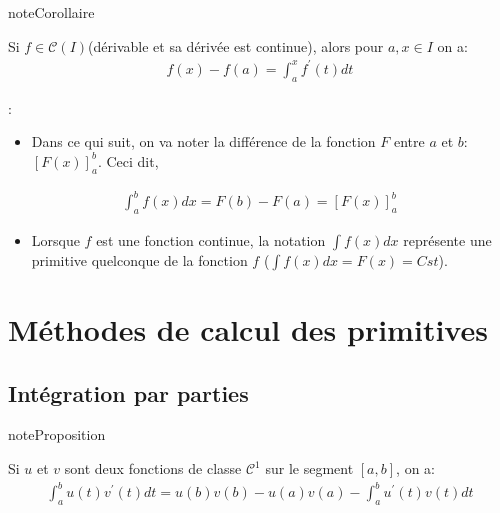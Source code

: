 \documentclass[letterpaper,10pt,french]{jupyterBook}
\begin{document}
\begin{sphinxadmonition}{note}{Corollaire}

\sphinxAtStartPar
Si \(f \in \mathcal C (I)\)(dérivable et sa dérivée est continue), alors pour \(a, x \in I\) on a:
\begin{equation*}
\begin{split}
f(x) - f(a) = \int_a^x f^{'}(t)dt
\end{split}
\end{equation*}\end{sphinxadmonition}

\sphinxAtStartPar
{}:
\begin{itemize}
\item {} 
\sphinxAtStartPar
Dans ce qui suit, on va noter la différence de la fonction \(F\) entre \(a\) et \(b\): \([F(x)]_a^b\). Ceci dit,

\end{itemize}
\begin{equation*}
\begin{split}
\int_a^b f(x)dx = F(b) - F(a) =[F(x)]_a^b
\end{split}
\end{equation*}\begin{itemize}
\item {} 
\sphinxAtStartPar
Lorsque \(f\) est une fonction continue, la notation \(\int f(x)dx\) représente une primitive quelconque de la fonction \(f\) (\(\int f(x)dx = F(x) = Cst\)).

\end{itemize}


\section{Méthodes de calcul des primitives}
\label{\detokenize{methodcalp:methodes-de-calcul-des-primitives}}\label{\detokenize{methodcalp::doc}}

\subsection{Intégration par parties}
\label{\detokenize{methodcalp:integration-par-parties}}
\begin{sphinxadmonition}{note}{Proposition}

\sphinxAtStartPar
Si \(u\) et \(v\) sont deux fonctions de classe \(\mathcal C^1\) sur le segment \([a, b]\), on a:
\begin{equation*}
\begin{split}
\int_a^b u(t)v^{'}(t)dt = u(b)v(b)- u(a)v(a) - \int_a^b u^{'}(t)v(t)dt
\end{split}
\end{equation*}\end{sphinxadmonition}
\end{document}
